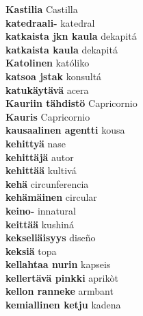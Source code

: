 \textbf{ Kastilia  } Castilla \\
\textbf{ katedraali-  } katedral \\
\textbf{ katkaista jkn kaula  } dekapitá \\
\textbf{ katkaista kaula  } dekapitá \\
\textbf{ Katolinen  } katóliko \\
\textbf{ katsoa jstak  } konsultá \\
\textbf{ katukäytävä  } acera \\
\textbf{ Kauriin tähdistö  } Capricornio \\
\textbf{ Kauris  } Capricornio \\
\textbf{ kausaalinen agentti  } kousa \\
\textbf{ kehittyä  } nase \\
\textbf{ kehittäjä  } autor \\
\textbf{ kehittää  } kultivá \\
\textbf{ kehä  } circunferencia \\
\textbf{ kehämäinen  } circular \\
\textbf{ keino-  } innatural \\
\textbf{ keittää  } kushiná \\
\textbf{ kekseliäisyys  } diseño \\
\textbf{ keksiä  } topa \\
\textbf{ kellahtaa nurin  } kapseis \\
\textbf{ kellertävä pinkki  } aprikòt \\
\textbf{ kellon ranneke  } armbant \\
\textbf{ kemiallinen ketju  } kadena \\
